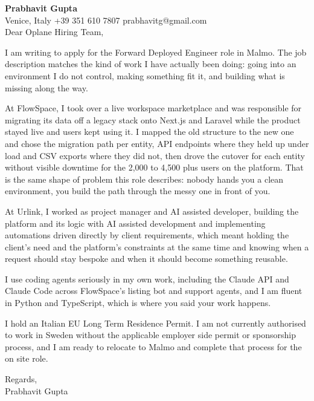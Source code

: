 \documentclass[a4paper,10.5pt]{article}
\begin{document}
\textbf{Prabhavit Gupta}\\
Venice, Italy \textbar{} +39 351 610 7807 \textbar{} prabhavitg@gmail.com\\[10pt]
Dear Oplane Hiring Team,

I am writing to apply for the Forward Deployed Engineer role in Malmo. The job description matches the kind of work I have actually been doing: going into an environment I do not control, making something fit it, and building what is missing along the way.

At FlowSpace, I took over a live workspace marketplace and was responsible for migrating its data off a legacy stack onto Next.js and Laravel while the product stayed live and users kept using it. I mapped the old structure to the new one and chose the migration path per entity, API endpoints where they held up under load and CSV exports where they did not, then drove the cutover for each entity without visible downtime for the 2,000 to 4,500 plus users on the platform. That is the same shape of problem this role describes: nobody hands you a clean environment, you build the path through the messy one in front of you.

At Urlink, I worked as project manager and AI assisted developer, building the platform and its logic with AI assisted development and implementing automations driven directly by client requirements, which meant holding the client's need and the platform's constraints at the same time and knowing when a request should stay bespoke and when it should become something reusable.

I use coding agents seriously in my own work, including the Claude API and Claude Code across FlowSpace's listing bot and support agents, and I am fluent in Python and TypeScript, which is where you said your work happens.

I hold an Italian EU Long Term Residence Permit. I am not currently authorised to work in Sweden without the applicable employer side permit or sponsorship process, and I am ready to relocate to Malmo and complete that process for the on site role.

Regards,\\
Prabhavit Gupta
\end{document}
